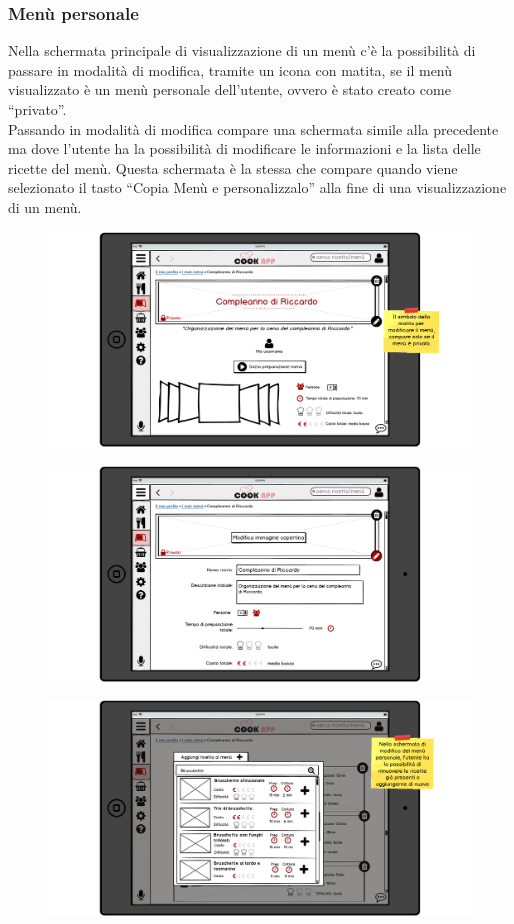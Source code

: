 \subsubsection{Menù personale}
Nella schermata principale di visualizzazione di un menù c'è la
possibilità di passare in modalità di modifica, tramite un icona con
matita, se il menù visualizzato è un menù personale dell'utente, ovvero
è stato creato come ``privato''.\\
Passando in modalità di modifica compare una schermata simile alla
precedente ma dove l'utente ha la possibilità di modificare le
informazioni e la lista delle ricette del menù. Questa schermata è la
stessa che compare quando viene selezionato il tasto ``Copia Menù e
personalizzalo'' alla fine di una visualizzazione di un menù.
\begin{figure}[H]
	\centering
	\includegraphics[width=0.95\linewidth]{img/mockup/menu-personale-1.png}
\end{figure}
\begin{figure}[H]
	\centering
	\includegraphics[width=0.95\linewidth]{img/mockup/menu-personale-2.png}
\end{figure}
\begin{figure}[H]
	\centering
	\includegraphics[width=0.95\linewidth]{img/mockup/menu-personale-3.png}
\end{figure}



